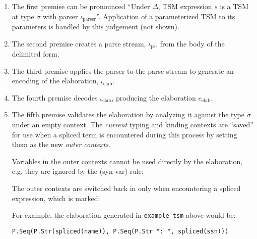\begin{enumerate}
\item The first premise can be pronounced ``Under $\Delta$, TSM expression $s$ is a TSM at type $\sigma$ with parser $\iota_\text{parser}$''. Application of a parameterized TSM to its parameters is handled by this judgement (not shown).
\item The second premise creates a parse stream, $\iota_\text{ps}$, from the body of the delimited form.
\item The third premise applies the parser to the parse stream to generate an encoding of the elaboration, $\iota_\text{elab}$.
\item The fourth premise decodes $\iota_\text{elab}$, producing the elaboration $e_\text{elab}$.
\item The fifth premise validates the elaboration by analyzing it against the type $\sigma$ under an empty context. The \emph{current} typing and kinding contexts are ``saved'' for use when a spliced term is encountered during this process by setting them as the new \emph{outer contexts}.

Variables in the outer contexts cannot be used directly by the elaboration, e.g. they are ignored by the (syn-var) rule:
\begin{mathpar}
\end{mathpar}
The outer contexts are switched back in only when encountering a spliced expression, which is marked:
\begin{mathpar}

\end{mathpar}
For example, the elaboration generated in \lstinline{example_tsm} above would be:
\begin{lstlisting}[numbers=none]
P.Seq(P.Str(spliced(name)), P.Seq(P.Str ": ", spliced(ssn)))
\end{lstlisting}
\end{enumerate}

